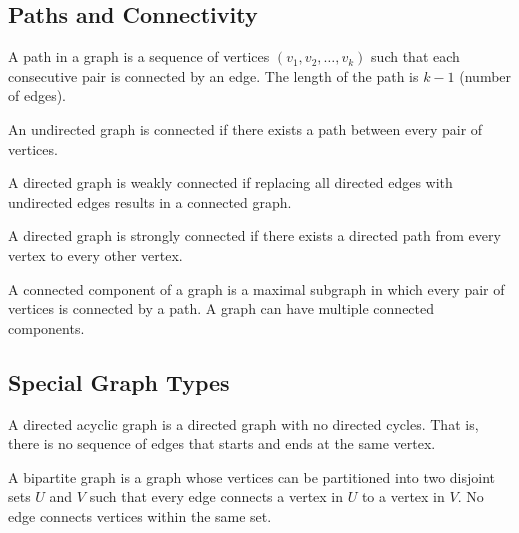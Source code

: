 \subsection{Paths and Connectivity}

\begin{definition}[Path]
A path in a graph is a sequence of vertices $(v_1, v_2, \ldots, v_k)$ such that each consecutive pair is connected by an edge. The length of the path is $k-1$ (number of edges).
\end{definition}

\begin{definition}
An undirected graph is connected if there exists a path between every pair of vertices.
\end{definition}

\begin{definition}
A directed graph is weakly connected if replacing all directed edges with undirected edges results in a connected graph.
\end{definition}

\begin{definition}
A directed graph is strongly connected if there exists a directed path from every vertex to every other vertex.
\end{definition}

\begin{definition}
A connected component of a graph is a maximal subgraph in which every pair of vertices is connected by a path. A graph can have multiple connected components.
\end{definition}

\subsection{Special Graph Types}

\begin{definition}
A directed acyclic graph is a directed graph with no directed cycles. That is, there is no sequence of edges that starts and ends at the same vertex.
\end{definition}

\begin{definition}
A bipartite graph is a graph whose vertices can be partitioned into two disjoint sets $U$ and $V$ such that every edge connects a vertex in $U$ to a vertex in $V$. No edge connects vertices within the same set.
\end{definition}

